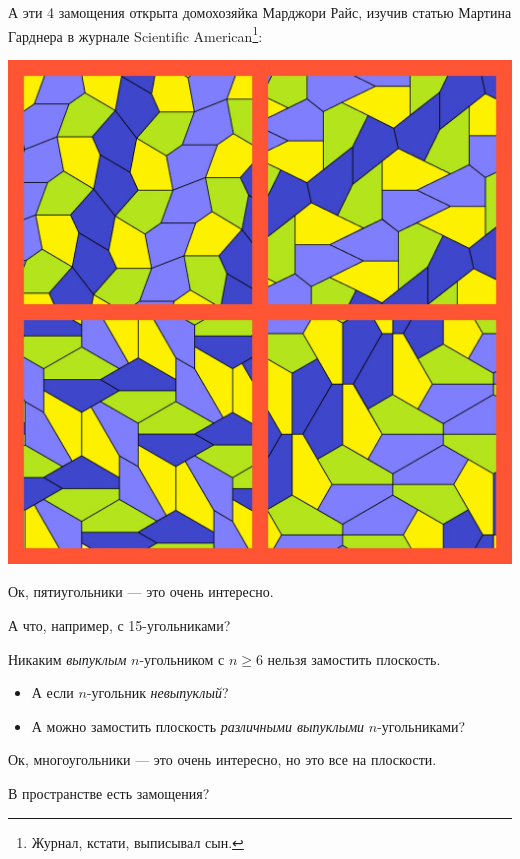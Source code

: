 \documentclass{beamer}
\begin{document}
\begin{frame}
А эти 4 замощения открыта домохозяйка Марджори Райс, изучив статью Мартина Гарднера в журнале Scientific American\footnote{Журнал, кстати, выписывал сын.}:

\begin{center}
\includegraphics[width=.6\textwidth]{collage_rice.jpg}
\end{center}

\end{frame}

\begin{frame}

Ок, пятиугольники --- это очень интересно. 

\medskip

А что, например, с 15-угольниками?

\medskip

\pause

\begin{theorem}
Никаким \emph{выпуклым} $n$-угольником с $n \geqslant 6$ нельзя замостить плоскость.
\end{theorem}

\medskip

\pause

\begin{itemize}

\item А если $n$-угольник \emph{невыпуклый}?\pause

\item А можно замостить плоскость \emph{различными выпуклыми} $n$-угольниками?
\end{itemize}

\end{frame}


\begin{frame}
Ок, многоугольники --- это очень интересно, но это все на плоскости. 

\pause

\bigskip

В пространстве есть замощения?
\end{frame}
\end{document}
